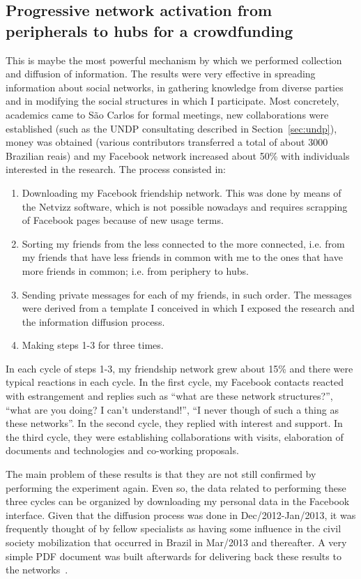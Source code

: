 \begin{apendicesenv}
\subsection{Progressive network activation from peripherals to hubs for a crowdfunding}
This is maybe the most powerful mechanism by which we performed collection and diffusion of information.
The results were very effective in spreading information about social networks,
in gathering knowledge from diverse parties and in modifying the social structures
in which I participate.
Most concretely, academics came to São Carlos for formal meetings,
new collaborations were established (such as the UNDP consultating described in Section~\ref{sec:undp}),
money was obtained (various contributors transferred a total of about 3000 Brazilian reais)
and my Facebook network increased about 50\% with individuals interested in the research.
The process consisted in:
\begin{enumerate}
	\item Downloading my Facebook friendship network. This was done by means of the Netvizz software,
		which is not possible nowadays and requires scrapping of Facebook pages because of new usage terms.
	\item Sorting my friends from the less connected to the more connected, i.e. from my friends that have less friends in common with me to the ones that have more friends in common; i.e. from periphery to hubs.
	\item Sending private messages for each of my friends, in such order.
		The messages were derived from a template I conceived in which I exposed the research and the information diffusion process.
	\item Making steps 1-3 for three times.
\end{enumerate}
In each cycle of steps 1-3, my friendship network grew about 15\% and there were typical reactions in each cycle.
In the first cycle, my Facebook contacts reacted with estrangement and replies such as ``what are these network structures?'',
``what are you doing? I can't understand!'', ``I never though of such a thing as these networks''.
In the second cycle, they replied with interest and support.
In the third cycle, they were establishing collaborations with visits, elaboration of documents and technologies and
co-working proposals.

The main problem of these results is that they are not still confirmed by performing the experiment again.
Even so, the data related to performing these three cycles can be organized by downloading my personal data in the Facebook interface.
Given that the diffusion process was done in Dec/2012-Jan/2013, it was frequently thought of by fellow specialists as
having some influence in the civil society mobilization that occurred in Brazil in Mar/2013 and thereafter.
A very simple PDF document was built afterwards for delivering back these results to the networks~\cite{docDif}.


\end{apendicesenv}
